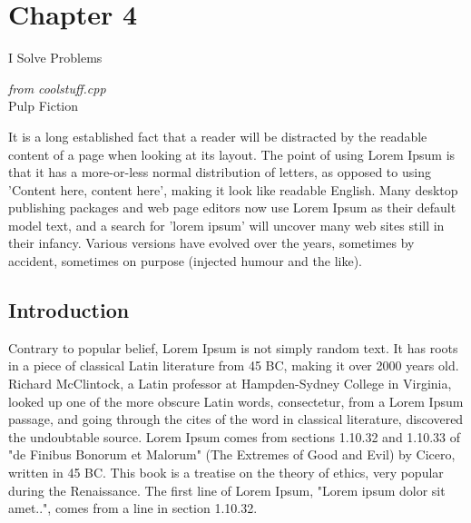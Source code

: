 \chapter{Chapter 4}
\addtocounter{footnote}{-1}  %
\thispagestyle{noheadrule}
\markboth{}{}
\label{ch:chapter4}
\pgfmathsetmacro\chapclr{\colourarray[4]}
\hypersetup{
  citecolor  = \chapclr,
  linkcolor  = \chapclr,
  urlcolor   = \chapclr,
}

\epigraph{
  I Solve Problems
  }{
    \textit{from coolstuff.cpp} \\
    Pulp Fiction
}

\begin{center}
    \begin{minipage}{\abstractwidth\textwidth}
      \begin{small}
        It is a long established fact that a reader will be distracted by the readable content of a page when looking at its layout.
        The point of using Lorem Ipsum is that it has a more-or-less normal distribution of letters, as opposed to using 'Content here, content here', making it look like readable English.
        Many desktop publishing packages and web page editors now use Lorem Ipsum as their default model text, and a search for 'lorem ipsum' will uncover many web sites still in their infancy.
        Various versions have evolved over the years, sometimes by accident, sometimes on purpose (injected humour and the like).
      \end{small}
    \end{minipage}
    \vspace{0.5cm}
\end{center}
\clearpage

\section{Introduction}

  Contrary to popular belief, Lorem Ipsum is not simply random text.
  It has roots in a piece of classical Latin literature from 45 BC, making it over 2000 years old.
  Richard McClintock, a Latin professor at Hampden-Sydney College in Virginia, looked up one of the more obscure Latin words, consectetur, from a Lorem Ipsum passage, and going through the cites of the word in classical literature, discovered the undoubtable source.
  Lorem Ipsum comes from sections 1.10.32 and 1.10.33 of "de Finibus Bonorum et Malorum" (The Extremes of Good and Evil) by Cicero, written in 45 BC.
  This book is a treatise on the theory of ethics, very popular during the Renaissance. The first line of Lorem Ipsum, "Lorem ipsum dolor sit amet..", comes from a line in section 1.10.32.

